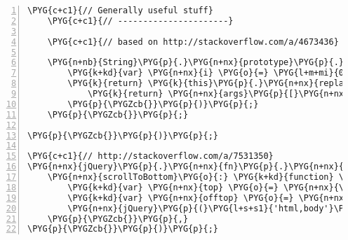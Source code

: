 \begin{Verbatim}[commandchars=\\\{\},numbers=left,firstnumber=1,stepnumber=5]
    \PYG{c+c1}{// Generally useful stuff}
    \PYG{c+c1}{// ----------------------}

    \PYG{c+c1}{// based on http://stackoverflow.com/a/4673436}

    \PYG{n+nb}{String}\PYG{p}{.}\PYG{n+nx}{prototype}\PYG{p}{.}\PYG{n+nx}{format} \PYG{o}{=} \PYG{k+kd}{function}\PYG{p}{(}\PYG{p}{)} \PYG{p}{\PYGZob{}}
        \PYG{k+kd}{var} \PYG{n+nx}{i} \PYG{o}{=} \PYG{l+m+mi}{0}\PYG{p}{;} \PYG{n+nx}{args} \PYG{o}{=} \PYG{n+nx}{arguments}\PYG{p}{;}
        \PYG{k}{return} \PYG{k}{this}\PYG{p}{.}\PYG{n+nx}{replace}\PYG{p}{(}\PYG{l+s+sr}{/\PYGZob{}\PYGZcb{}/g}\PYG{p}{,} \PYG{k+kd}{function}\PYG{p}{(}\PYG{p}{)} \PYG{p}{\PYGZob{}}
            \PYG{k}{return} \PYG{n+nx}{args}\PYG{p}{[}\PYG{n+nx}{i}\PYG{o}{++}\PYG{p}{]}\PYG{p}{;}
        \PYG{p}{\PYGZcb{}}\PYG{p}{)}\PYG{p}{;}
    \PYG{p}{\PYGZcb{}}\PYG{p}{;}

\PYG{p}{\PYGZcb{}}\PYG{p}{)}\PYG{p}{;}

\PYG{c+c1}{// http://stackoverflow.com/a/7531350}
\PYG{n+nx}{jQuery}\PYG{p}{.}\PYG{n+nx}{fn}\PYG{p}{.}\PYG{n+nx}{extend}\PYG{p}{(}\PYG{p}{\PYGZob{}}
    \PYG{n+nx}{scrollToBottom}\PYG{o}{:} \PYG{k+kd}{function} \PYG{p}{(}\PYG{p}{)} \PYG{p}{\PYGZob{}}
        \PYG{k+kd}{var} \PYG{n+nx}{top} \PYG{o}{=} \PYG{n+nx}{\PYGZdl{}}\PYG{p}{(}\PYG{k}{this}\PYG{p}{)}\PYG{p}{.}\PYG{n+nx}{offset}\PYG{p}{(}\PYG{p}{)}\PYG{p}{.}\PYG{n+nx}{top}\PYG{p}{;}
        \PYG{k+kd}{var} \PYG{n+nx}{offtop} \PYG{o}{=} \PYG{n+nx}{top} \PYG{o}{-} \PYG{l+m+mi}{250} \PYG{o}{+} \PYG{n+nx}{\PYGZdl{}}\PYG{p}{(}\PYG{k}{this}\PYG{p}{)}\PYG{p}{.}\PYG{n+nx}{height}\PYG{p}{(}\PYG{p}{)}\PYG{p}{;}
        \PYG{n+nx}{jQuery}\PYG{p}{(}\PYG{l+s+s1}{'html,body'}\PYG{p}{)}\PYG{p}{.}\PYG{n+nx}{animate}\PYG{p}{(}\PYG{p}{\PYGZob{}}\PYG{n+nx}{scrollTop}\PYG{o}{:} \PYG{n+nx}{offtop}\PYG{p}{\PYGZcb{}}\PYG{p}{,} \PYG{l+m+mi}{100}\PYG{p}{)}\PYG{p}{;}
    \PYG{p}{\PYGZcb{}}\PYG{p}{,}
\PYG{p}{\PYGZcb{}}\PYG{p}{)}\PYG{p}{;}
\end{Verbatim}



